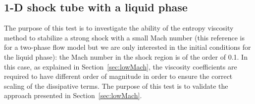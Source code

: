 \documentclass[preprint,10pt]{elsarticle}
\newcommand{\sct}[1]{Section~\ref{#1}}                   %
\newcommand{\tcr}[1]{\textcolor{red}{#1}}
\newcommand{\tcb}[1]{\textcolor{blue}{#1}}
\begin{document}
\subsection{1-D shock tube with a liquid phase} \label{sec:liquid_shock}
The purpose of this test is to investigate the ability of the entropy viscosity method to stabilize a strong shock with a small Mach number \cite{abgrall} (this reference is for a two-phase flow model but we are only interested in the initial conditions for the liquid phase): the Mach number in the shock region is of the order of 0.1. In this case, as explained in \sct{sec:lowMach}, the viscosity coefficients are required to have different order of magnitude in order to ensure the correct scaling of the dissipative terms. The purpose of this test is to validate the approach presented in \sct{sec:lowMach}. 
\end{document}
